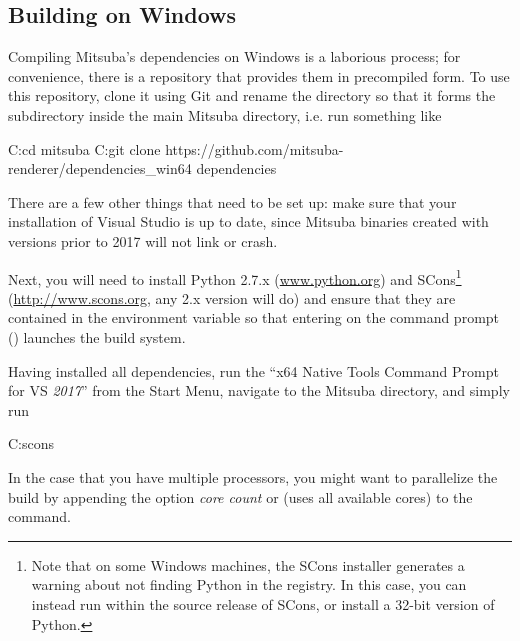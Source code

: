 
\subsection{Building on Windows}
Compiling Mitsuba's dependencies on Windows is a laborious process; for convenience, there
is a repository that provides them in precompiled form. To use this repository, clone it
using Git and rename the directory so that it forms the  subdirectory
inside the main Mitsuba directory, i.e. run something like
\begin{shell}
C:\>cd mitsuba
C:\mitsuba\>git clone https://github.com/mitsuba-renderer/dependencies_win64 dependencies
\end{shell}
There are a few other things that need to be set up: make sure that your
installation of Visual Studio is up to date, since Mitsuba binaries created with versions prior to 2017 will not link or crash.

Next, you will need to install Python 2.7.x
(\url{www.python.org}) and SCons\footnote{Note that on some Windows machines, the SCons
installer generates a warning about not finding Python in the registry. In this case, you
can instead run  within the source release of SCons, or install a 32-bit version of Python.}
(\url{http://www.scons.org}, any 2.x version will do) and ensure that they are contained in the 
environment variable so that entering  on the command prompt ()
launches the build system.

Having installed all dependencies, run the ``x64 Native Tools Command Prompt
for VS \emph{2017}'' from the Start Menu,
navigate to the Mitsuba directory, and simply run
\begin{shell}
C:\mitsuba\>scons
\end{shell}
In the case that you have multiple processors, you might want to parallelize the build by appending the option \emph{core count} or  (uses all available cores) to the  command.

